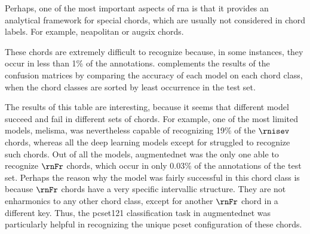 
Perhaps, one of the most important aspects of \gls{rna} is
that it provides an analytical framework for special chords,
which are usually not considered in chord labels. For
example, \gls{neapolitan} or \gls{augsix} chords.

These chords are extremely difficult to recognize because,
in some instances, they occur in less than 1\% of the
annotations.  complements the results of
the confusion matrices by comparing the accuracy of each
model on each chord class, when the chord classes are sorted
by least occurrence in the test set.

The results of this table are interesting, because it seems
that different model succeed and fail in different sets of
chords. For example, one of the most limited models,
\gls{melisma}, was nevertheless capable of recognizing 19\%
of the $\rnisev$ chords, whereas all the deep learning
models except for \textcite{mcleod2021modular} struggled to
recognize such chords. Out of all the models,
\gls{augmentednet} was the only one able to recognize $\rnFr$
chords, which occur in only 0.03\% of the annotations of the
test set. Perhaps the reason why the model was fairly
successful in this chord class is because $\rnFr$ chords
have a very specific intervallic structure. They are not
enharmonics to any other chord class, except for another
$\rnFr$ chord in a different key. Thus, the \gls{pcset121}
classification task in \gls{augmentednet} was particularly
helpful in recognizing the unique \gls{pcset} configuration
of these chords.


